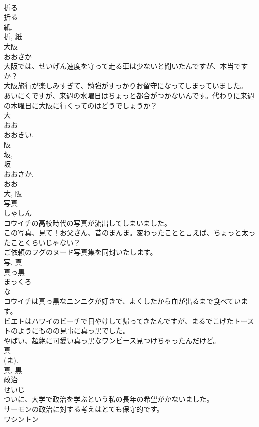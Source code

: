 \documentclass[8pt]{extreport}
\begin{document}
\begin{CJK}{UTF8}{min}
\\	折る 
\\	折る 
\\	紙. 
\\	折, 紙	
\\	大阪	
\\	おおさか	
\\	大阪では、せいげん速度を守って走る車は少ないと聞いたんですが、本当ですか？	
\\	大阪旅行が楽しみすぎて、勉強がすっかりお留守になってしまっていました。	
\\	あいにくですが、来週の水曜日はちょっと都合がつかないんです。代わりに来週の木曜日に大阪に行くってのはどうでしょうか？	
\\	大 
\\	おお 
\\	おおきい. 
\\	阪 
\\	坂, 
\\	坂 
\\	おおさか. 
\\	おお 
\\	大, 阪	
\\	写真	
\\	しゃしん	
\\	コウイチの高校時代の写真が流出してしまいました。	
\\	この写真、見て！お父さん、昔のまんま。変わったことと言えば、ちょっと太ったことくらいじゃない？	
\\	ご依頼のフグのヌード写真集を同封いたします。	
\\	写, 真	
\\	真っ黒	
\\	まっくろ	
\\	な 
\\	コウイチは真っ黒なニンニクが好きで、よくしたから血が出るまで食べています。	
\\	ビエトはハワイのビーチで日やけして帰ってきたんですが、まるでこげたトーストのようにものの見事に真っ黒でした。	
\\	やばい、超絶に可愛い真っ黒なワンピース見つけちゃったんだけど。	
\\	真 
\\	(ま). 
\\	真, 黒	
\\	政治	
\\	せいじ	
\\	ついに、大学で政治を学ぶという私の長年の希望がかないました。	
\\	サーモンの政治に対する考えはとても保守的です。	
\\	ワシントン

\end{CJK}
\end{document}
